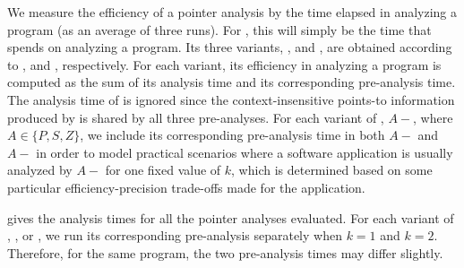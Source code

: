 We measure the efficiency of a pointer analysis by  the time elapsed in analyzing a program (as an average of three runs). 
For , this will simply be the time that  spends on analyzing a program. Its three variants, 
,  and , are obtained according to \tool, \selectx and \zipper,
respectively. For each variant,
its efficiency
in analyzing a program is computed as  the sum of its analysis time and its
corresponding pre-analysis
 time.
The analysis time of \spark is ignored since 
the
context-insensitive points-to information produced by \spark is
shared by
 all three pre-analyses. For each variant of , $A-$,
 where $A\in\{P, S, Z\}$,
 we include its
 corresponding pre-analysis time in both $A-$ and $A-$ in order
 to model practical scenarios where a software application is usually
 analyzed by  $A-$ for one fixed value of $k$, which is determined
based on  some
 particular efficiency-precision trade-offs made for the application.








 gives the analysis times for all the pointer analyses evaluated.
For each variant of , ,  or ,
we run its corresponding pre-analysis separately
when $k=1$ and $k=2$. Therefore, for the same  program,
the two pre-analysis times  may differ slightly.



